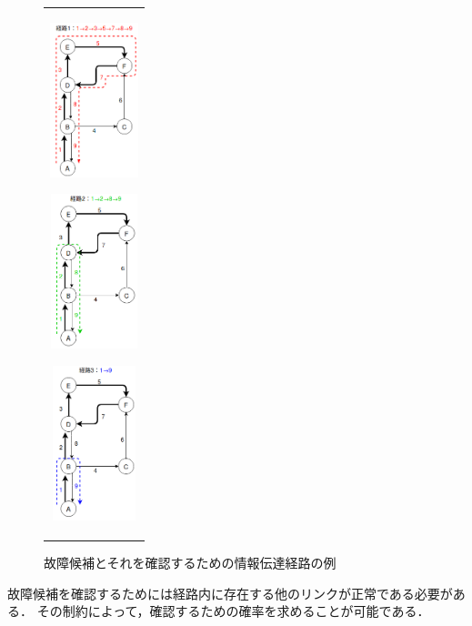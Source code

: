 \documentclass[11pt]{jsarticle}%
\begin{document}
\begin{multicols}{2}
  \begin{figure}[H]
    \centering
       \begin{tabular}{c}
          \begin{minipage}{0.30\hsize}
          \centering
          \includegraphics[height=4.5cm]{../figure/route1.png}
             \label{fig:route1}
          \end{minipage}
          \begin{minipage}{0.30\hsize}
          \centering
          \includegraphics[height=4.5cm]{../figure/route2.png}
             \label{fig:route2}
          \end{minipage}
          \begin{minipage}{0.30\hsize}
             \centering
             \includegraphics[height=4.5cm]{../figure/route3.png}
                \label{fig:route2}
             \end{minipage}
       \end{tabular} 
       \caption{故障候補とそれを確認するための情報伝達経路の例}%
       \label{fig:route}
 \end{figure}
故障候補を確認するためには経路内に存在する他のリンクが正常である必要がある．
その制約によって，確認するための確率を求めることが可能である．


\end{multicols}
\end{document}
